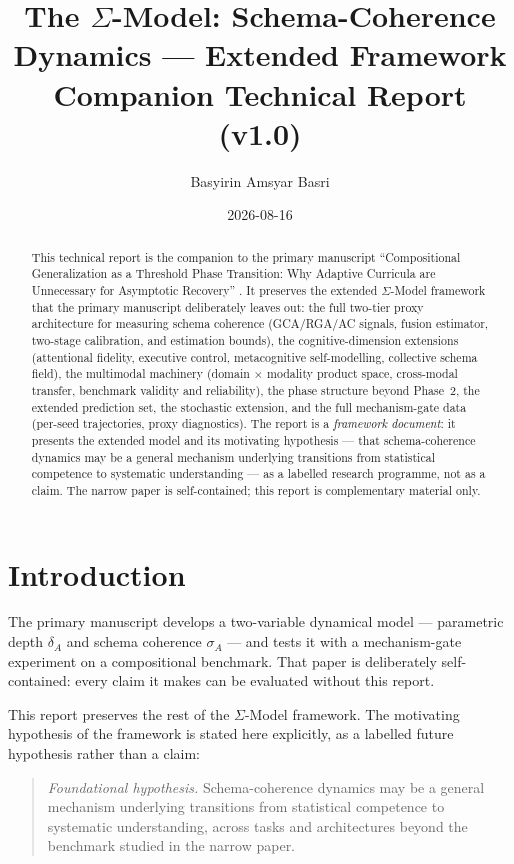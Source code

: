 \documentclass[11pt]{article}
\title{The $\Sigma$-Model: Schema-Coherence Dynamics --- Extended Framework\\
\large Companion Technical Report (v1.0)}
\author{Basyirin Amsyar Basri}
\date{2026-08-16}
\theoremstyle{definition}
\theoremstyle{plain}
\begin{document}
\maketitle

\begin{abstract}
This technical report is the companion to the primary manuscript ``Compositional Generalization as a Threshold Phase Transition: Why Adaptive Curricula are Unnecessary for Asymptotic Recovery'' \citep{sigmaTrap2026narrow}. It preserves the extended
$\Sigma$-Model framework that the primary manuscript deliberately leaves out:
the full two-tier proxy architecture for measuring schema coherence
(GCA/RGA/AC signals, fusion estimator, two-stage calibration, and
estimation bounds), the cognitive-dimension extensions (attentional
fidelity, executive control, metacognitive self-modelling, collective
schema field), the multimodal machinery (domain $\times$ modality
product space, cross-modal transfer, benchmark validity and
reliability), the phase structure beyond Phase~2, the extended
prediction set, the stochastic extension, and the full mechanism-gate
data (per-seed trajectories, proxy diagnostics). The report is a
\emph{framework document}: it presents the extended model and its
motivating hypothesis --- that schema-coherence dynamics may be a
general mechanism underlying transitions from statistical competence to
systematic understanding --- as a labelled research programme, not as a
claim. The narrow paper is self-contained; this report is complementary
material only.
\end{abstract}

\section{Introduction}\label{sec:intro}

The primary manuscript \citep{sigmaTrap2026narrow} develops a two-variable dynamical model
--- parametric depth $\delta_A$ and schema coherence $\sigma_A$ --- and
tests it with a mechanism-gate experiment on a compositional benchmark.
That paper is deliberately self-contained: every claim it makes can be
evaluated without this report.

This report preserves the rest of the $\Sigma$-Model framework. The
motivating hypothesis of the framework is stated here explicitly, as a
labelled future hypothesis rather than a claim:

\begin{quote}
\emph{Foundational hypothesis.} Schema-coherence dynamics may be a
general mechanism underlying transitions from statistical competence to
systematic understanding, across tasks and architectures beyond the
benchmark studied in the narrow paper.
\end{quote}
\end{document}
